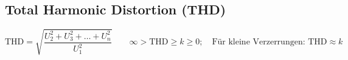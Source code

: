 \subsection{Total Harmonic Distortion (THD) }
$$\text{THD} = \sqrt{ \frac {U_2^2+ U_3^2 + \ldots + U_n^2} {U_1^2} } \qquad
\infty > \text{THD} \geq k \geq 0; \quad \text{Für kleine Verzerrungen: THD}
\approx k $$